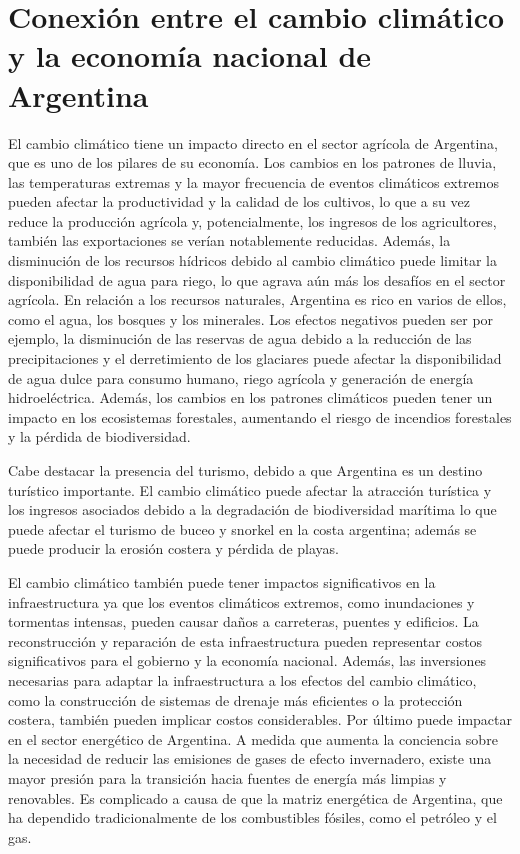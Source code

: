 \documentclass[runningheads]{llncs}
\begin{document}
\section{Conexión entre el cambio climático y la economía nacional de Argentina}

\hspace{0.5cm} El cambio climático tiene un impacto directo en el sector agrícola de Argentina, que es uno de los pilares de su economía. Los cambios en los patrones de lluvia, las temperaturas extremas y la mayor frecuencia de eventos climáticos extremos pueden afectar la productividad y la calidad de los cultivos, lo que a su vez reduce la producción agrícola y, potencialmente, los ingresos de los agricultores, también las exportaciones se verían notablemente reducidas. Además, la disminución de los recursos hídricos debido al cambio climático puede limitar la disponibilidad de agua para riego, lo que agrava aún más los desafíos en el sector agrícola.
En relación a los recursos naturales, Argentina es rico en varios de ellos, como el agua, los bosques y los minerales. Los efectos negativos pueden ser por ejemplo, la disminución de las reservas de agua debido a la reducción de las precipitaciones y el derretimiento de los glaciares puede afectar la disponibilidad de agua dulce para consumo humano, riego agrícola y generación de energía hidroeléctrica. Además, los cambios en los patrones climáticos pueden tener un impacto en los ecosistemas forestales, aumentando el riesgo de incendios forestales y la pérdida de biodiversidad.

Cabe destacar la presencia del turismo, debido a que Argentina es un destino turístico importante. El cambio climático puede afectar la atracción turística y los ingresos asociados debido a la degradación de biodiversidad marítima lo que puede afectar el turismo de buceo y snorkel en la costa argentina; además se puede producir la erosión costera y pérdida de playas.

El cambio climático también puede tener impactos significativos en la infraestructura ya que los eventos climáticos extremos, como inundaciones y tormentas intensas, pueden causar daños a carreteras, puentes y edificios. La reconstrucción y reparación de esta infraestructura pueden representar costos significativos para el gobierno y la economía nacional. Además, las inversiones necesarias para adaptar la infraestructura a los efectos del cambio climático, como la construcción de sistemas de drenaje más eficientes o la protección costera, también pueden implicar costos considerables.
Por último puede impactar en el sector energético de Argentina. A medida que aumenta la conciencia sobre la necesidad de reducir las emisiones de gases de efecto invernadero, existe una mayor presión para la transición hacia fuentes de energía más limpias y renovables. Es complicado a causa de que la matriz energética de Argentina, que ha dependido tradicionalmente de los combustibles fósiles, como el petróleo y el gas. 
\end{document}
